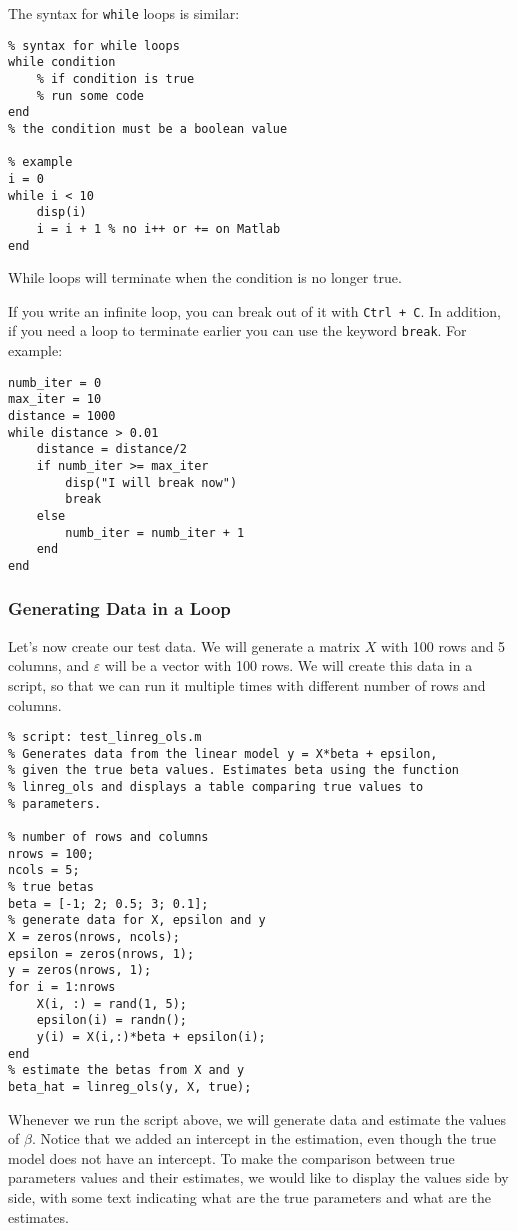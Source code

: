 \documentclass[12pt, a4paper]{article}
\begin{document}
The syntax for \texttt{while} loops is similar:
\lstset{language=matlab,label= ,caption= ,captionpos=b,firstnumber=1,numbers=left,style=Matlab-editor}
\begin{lstlisting}
% syntax for while loops
while condition
    % if condition is true
    % run some code
end
% the condition must be a boolean value

% example
i = 0
while i < 10
    disp(i)
    i = i + 1 % no i++ or += on Matlab
end
\end{lstlisting}
While loops will terminate when the condition is no longer true.

If you write an infinite loop, you can break out of it with \texttt{Ctrl + C}.
In addition, if you need a loop to terminate earlier you can use the keyword \texttt{break}.
For example:
\lstset{language=matlab,label= ,caption= ,captionpos=b,firstnumber=1,numbers=left,style=Matlab-editor}
\begin{lstlisting}
numb_iter = 0
max_iter = 10
distance = 1000
while distance > 0.01
    distance = distance/2
    if numb_iter >= max_iter
        disp("I will break now")
        break
    else
        numb_iter = numb_iter + 1
    end
end
\end{lstlisting}
\subsubsection{Generating Data in a Loop}
\label{sec:orgc3bc6fb}
Let's now create our test data.
We will generate a matrix \(X\) with 100 rows and 5 columns, and \(\varepsilon\) will be a vector with 100 rows.
We will create this data in a script, so that we can run it multiple times with different number of rows and columns.
\lstset{language=matlab,label= ,caption= ,captionpos=b,firstnumber=1,numbers=left,style=Matlab-editor}
\begin{lstlisting}
% script: test_linreg_ols.m
% Generates data from the linear model y = X*beta + epsilon,
% given the true beta values. Estimates beta using the function
% linreg_ols and displays a table comparing true values to
% parameters.

% number of rows and columns
nrows = 100;
ncols = 5;
% true betas
beta = [-1; 2; 0.5; 3; 0.1];
% generate data for X, epsilon and y
X = zeros(nrows, ncols);
epsilon = zeros(nrows, 1);
y = zeros(nrows, 1);
for i = 1:nrows
    X(i, :) = rand(1, 5);
    epsilon(i) = randn();
    y(i) = X(i,:)*beta + epsilon(i);
end
% estimate the betas from X and y
beta_hat = linreg_ols(y, X, true);
\end{lstlisting}
Whenever we run the script above, we will generate data and estimate the values of \(\beta\).
Notice that we added an intercept in the estimation, even though the true model does not have an intercept.
To make the comparison between true parameters values and their estimates, we would like to display the values side by side, with some text indicating what are the true parameters and what are the estimates.
\end{document}
